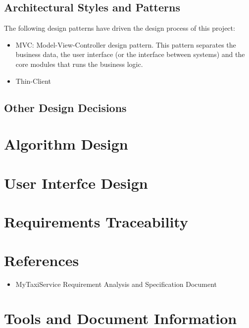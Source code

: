\documentclass[11pt, a4paper,titlepage]{article}
\newcommand{\productname}{MyTaxiService }
\begin{document}
\subsection{Architectural Styles and Patterns}
	The following design patterns have driven the design process of this project:
	\begin{itemize}
		\item MVC: Model-View-Controller design pattern. This pattern separates the business data, the user interface (or the interface between systems) and the core modules that runs the business logic. 
		\item Thin-Client
	\end{itemize}
\subsection{Other Design Decisions}

\section{Algorithm Design}
\section{User Interfce Design}
\section{Requirements Traceability}
\section{References}
\begin{itemize}
	\item \productname Requirement Analysis and Specification Document
\end{itemize}
\section{Tools and Document Information}
\end{document}
